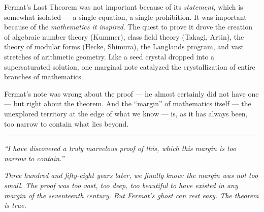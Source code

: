 Fermat's Last Theorem was not important because of its \emph{statement}, which is somewhat isolated --- a single equation, a single prohibition. It was important because of the \emph{mathematics it inspired}. The quest to prove it drove the creation of algebraic number theory (Kummer), class field theory (Takagi, Artin), the theory of modular forms (Hecke, Shimura), the Langlands program, and vast stretches of arithmetic geometry. Like a seed crystal dropped into a supersaturated solution, one marginal note catalyzed the crystallization of entire branches of mathematics.

Fermat's note was wrong about the proof --- he almost certainly did not have one --- but right about the theorem. And the ``margin'' of mathematics itself --- the unexplored territory at the edge of what we know --- is, as it has always been, too narrow to contain what lies beyond.

\bigskip\noindent\rule{\linewidth}{0.4pt}\bigskip

\emph{``I have discovered a truly marvelous proof of this, which this margin is too narrow to contain.''}

\emph{Three hundred and fifty-eight years later, we finally know: the margin was not too small. The proof was too vast, too deep, too beautiful to have existed in any margin of the seventeenth century. But Fermat's ghost can rest easy. The theorem is true.}
